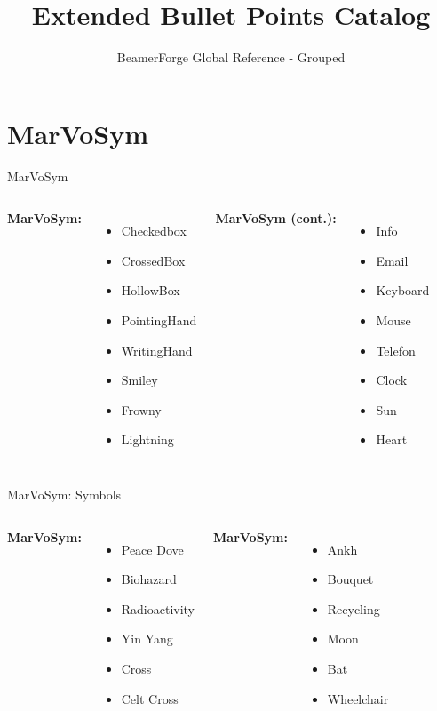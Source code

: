 \documentclass[10pt]{beamer}
\title{Extended Bullet Points Catalog}
\subtitle{BeamerForge Global Reference - Grouped}
\date{}
\begin{document}
\section{MarVoSym}

\begin{frame}{MarVoSym}
\begin{columns}
\textbf{MarVoSym:}
\begin{itemize}
  \item \Checkedbox Checkedbox
  \item \CrossedBox CrossedBox
  \item \HollowBox HollowBox
  \item \PointingHand PointingHand
  \item \WritingHand WritingHand
  \item \Smiley Smiley
  \item \Frowny Frowny
  \item \Lightning Lightning
\end{itemize}

\textbf{MarVoSym (cont.):}
\begin{itemize}
  \item \Info Info
  \item \Email Email
  \item \Keyboard Keyboard
  \item \ComputerMouse Mouse
  \item \Telefon Telefon
  \item \ClockLogo Clock
  \item \Sun Sun
  \item \Heart Heart
\end{itemize}
\end{columns}
\end{frame}

\begin{frame}{MarVoSym: Symbols}
\begin{columns}
\textbf{MarVoSym:}
\begin{itemize}
  \item \PeaceDove Peace Dove
  \item \Biohazard Biohazard
  \item \Radioactivity Radioactivity
  \item \YinYang Yin Yang
  \item \Cross Cross
  \item \CeltCross Celt Cross
\end{itemize}

\textbf{MarVoSym:}
\begin{itemize}
  \item \Ankh Ankh
  \item \Bouquet Bouquet
  \item \Recycling Recycling
  \item \Moon Moon
  \item \Bat Bat
  \item \Wheelchair Wheelchair
\end{itemize}
\end{columns}
\end{frame}
\end{document}
